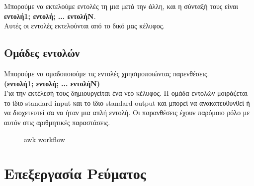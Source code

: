 Μπορούμε να εκτελούμε εντολές τη μια μετά την άλλη, και η σύνταξή τους είναι\\
\textbf{εντολή1; εντολή; ... εντολήΝ}. \\
Αυτές οι εντολές εκτελούνται από το δικό μας κέλυφος.

\subsection{Ομάδες εντολών}

Μπορούμε να ομαδοποιούμε τις εντολές χρησιμοποιώντας παρενθέσεις. \\
\textbf{(εντολή1; εντολή; ... εντολήΝ)}\\
Για την εκτέλεσή τους δημιουργείται ένα νεο κέλυφος. Η ομάδα εντολών μοιράζεται το ίδιο standard input και το ίδιο standard output
και μπορεί να ανακατευθυνθεί ή να διοχετευτεί σα να ήταν μια απλή εντολή. Οι παρανθέσεις έχουν παρόμοιο ρόλο με αυτόν στις
αριθμητικές παραστάσεις.


\begin{figure}
	\centering
	\caption{awk workflow}
\end{figure} 


\section{Επεξεργασία Ρεύματος}

